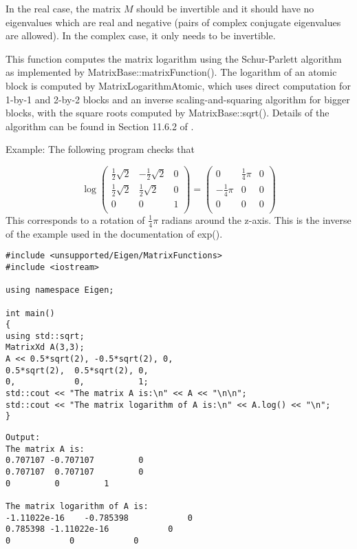 In the real case, the matrix $M$ should be invertible and it should have no eigenvalues which are real and negative (pairs of complex conjugate eigenvalues are allowed). In the complex case, it only needs to be invertible.

This function computes the matrix logarithm using the Schur-Parlett algorithm as implemented by MatrixBase::matrixFunction(). The logarithm of an atomic block is computed by MatrixLogarithmAtomic, which uses direct computation for 1-by-1 and 2-by-2 blocks and an inverse scaling-and-squaring algorithm for bigger blocks, with the square roots computed by MatrixBase::sqrt().
Details of the algorithm can be found in Section 11.6.2 of \cite{Higham_2008}.

Example: The following program checks that 


\begin{equation} 
\log
\begin{pmatrix}
\tfrac{1}{2}\sqrt{2} & -\tfrac{1}{2}\sqrt{2} & 0 \\
\tfrac{1}{2}\sqrt{2} & \tfrac{1}{2}\sqrt{2} & 0 \\
0 & 0 & 1 \\
\end{pmatrix}
=
\begin{pmatrix}
0 & \tfrac{1}{4}\pi & 0 \\
-\tfrac{1}{4}\pi  & 0 & 0 \\
0 & 0 & 0 \\
\end{pmatrix}
\end{equation} 
This corresponds to a rotation of $\tfrac{1}{4}\pi$ radians around the z-axis. This is the inverse of the example used in the documentation of exp().



\begin{lstlisting}
#include <unsupported/Eigen/MatrixFunctions>
#include <iostream>

using namespace Eigen;

int main()
{
using std::sqrt;
MatrixXd A(3,3);
A << 0.5*sqrt(2), -0.5*sqrt(2), 0,
0.5*sqrt(2),  0.5*sqrt(2), 0,
0,            0,           1;
std::cout << "The matrix A is:\n" << A << "\n\n";
std::cout << "The matrix logarithm of A is:\n" << A.log() << "\n";
}
\end{lstlisting}

\begin{verbatim}			
Output:
The matrix A is:
0.707107 -0.707107         0
0.707107  0.707107         0
0         0         1

The matrix logarithm of A is:
-1.11022e-16    -0.785398            0
0.785398 -1.11022e-16            0
0            0            0

\end{verbatim}




